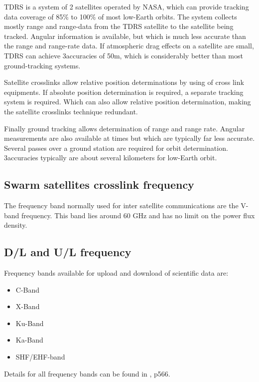 TDRS is a system of 2 satellites operated by NASA, which can provide tracking data coverage of 85\% to 100\% of most low-Earth orbits. The system collects mostly range and range-data from the TDRS satellite to the satellite being tracked. Angular information is available, but which is much less accurate than the range and range-rate data. If atmospheric drag effects on a satellite are small, TDRS can achieve 3\sigma accuracies of 50m, which is considerably better than most ground-tracking systems.

Satellite crosslinks allow relative position determinations by using of cross link equipments. If absolute position determination is required, a separate tracking system is required. Which can also allow relative position determination, making the satellite crosslinks technique redundant.

Finally ground tracking allows determination of range and range rate. Angular measurements are also available at times but which are typically far less accurate. Several passes over a ground station are required for orbit determination. 3\sigma accuracies typically are about several kilometers for low-Earth orbit.

\subsection{Swarm satellites crosslink frequency}
The frequency band normally used for inter satellite communications are the V-band frequency. This band lies around 60 GHz and has no limit on the power flux density.

\subsection{D/L and U/L frequency}
Frequency bands available for upload and download of scientific data are:
\begin{itemize}
\item C-Band
\item X-Band
\item Ku-Band
\item Ka-Band
\item SHF/EHF-band
\end{itemize}

Details for all frequency bands can be found in \cite{larson}, p566.

